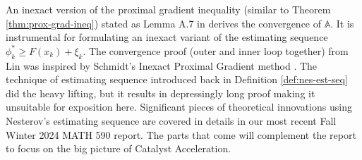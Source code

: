 \documentclass[12pt]{article}
\begin{document}
            \par 
            An inexact version of the proximal gradient inequality (similar to Theorem \ref{thm:prox-grad-ineq}) stated as Lemma A.7 in \cite{lin_universal_2015} derives the convergence of $\mathbb A$. 
            It is instrumental for formulating an inexact variant of the estimating sequence $\phi_k^* \ge F(x_k) + \xi_k$. 
            The convergence proof (outer and inner loop together) from Lin was inspired by Schmidt's Inexact Proximal Gradient method \cite{schmidt_convergence_2011}. 
            The technique of estimating sequence introduced back in Definition \ref{def:nes-est-seq} did the heavy lifting, but it results in depressingly long proof making it unsuitable for exposition here. 
            Significant pieces of theoretical innovations using Nesterov's estimating sequence are covered in details in our most recent Fall Winter 2024 MATH 590 report. 
            The parts that come will complement the report to focus on the big picture of Catalyst Acceleration. 
\end{document}
